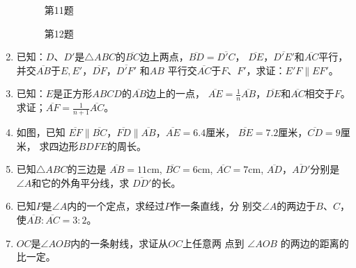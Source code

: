 \begin{enumerate}
\begin{figure}
    \begin{minipage}[t]{0.48\linewidth}
    \centering
\begin{tikzpicture}[>=latex, scale=1]
    \end{tikzpicture}
    \caption*{第11题}
    \end{minipage}
    \begin{minipage}[t]{0.48\linewidth}
    \centering
    \begin{tikzpicture}[>=latex, scale=1]
    \end{tikzpicture}
    \caption*{第12题}
    \end{minipage}
    \end{figure}

\item 已知：$D$、$D'$是$\triangle ABC$的$\overline{BC}$边上两点，$\overline{BD}=\overline{D'C}$，
$\overline{DE}$，$\overline{D'E'}$和$\overline{AC}$平行，并交$\overline{AB}$于$E,E'$，$\overline{DF}$，$\overline{D'F'}$ 和$AB$
平行交$\overline{AC}$于$F$、$F'$，求证：$E'F\parallel EF'$。
\item 已知：$E$是正方形$ABCD$的$\overline{AB}$边上的一点，
$\overline{AE}=\frac{1}{n}\overline{AB}$，$\overline{DE}$和$\overline{AC}$相交于$F$。求证；$\overline{AF}=\frac{1}{n+1}\overline{AC}$。
\item 如图，已知 $\overline{EF}\parallel \overline{BC}$，$\overline{FD}\parallel\overline{AB}$，$\overline{AE}=6.4$厘米，
$\overline{BE}=7.2$厘米，$\overline{CD}=9$厘米，
求四边形$BDFE$的周长。
\item 已知$\triangle ABC$的三边是
$\overline{AB}=11$cm, $\overline{BC}=6$cm,
$\overline{AC}=7$cm, $\overline{AD}$，$\overline{AD'}$分别是$\angle A$和它的外角平分线，求
$\overline{DD'}$的长。
\item 已知$P$是$\angle A$内的一个定点，求经过$P$作一条直线，分
别交$\angle A$的两边于$B$、$C$，使$\overline{AB}:\overline{AC}=3:2$。
\item $OC$是$\angle AOB$内的一条射线，求证从$OC$上任意两 点到 $\angle AOB$ 的两边的距离的比一定。


\end{enumerate}
